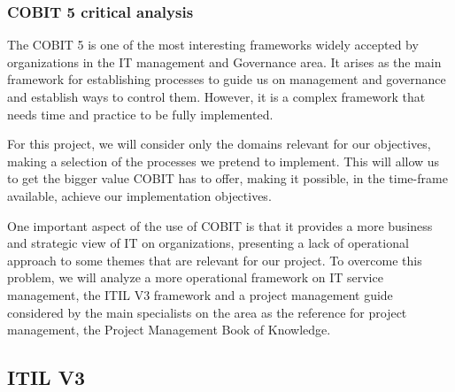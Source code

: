 \subsubsection{COBIT 5 critical analysis}

The COBIT 5 is one of the most interesting frameworks widely accepted by organizations in the IT management and Governance area. It arises as the main framework for establishing processes to guide us on management and governance and establish ways to control them. However, it is a complex framework that needs time and practice to be fully implemented.\par
For this project, we will consider only the domains relevant for our objectives, making a selection of the processes we pretend to implement. This will allow us to get the bigger value COBIT has to offer, making it possible, in the time-frame available, achieve our implementation objectives.\par
One important aspect of the use of COBIT is that it provides a more business and strategic view of IT on organizations, presenting a lack of operational approach to some themes that are relevant for our project. To overcome this problem, we will analyze a more operational framework on IT service management, the ITIL V3 framework\cite{itilIntro,itilSS,itilST,itilSD,itilSO,itilCSI} and a project management guide considered by the main specialists on the area as the reference for project management, the Project Management Book of Knowledge\cite{pmbok5}.\par


\subsection{ITIL V3}

